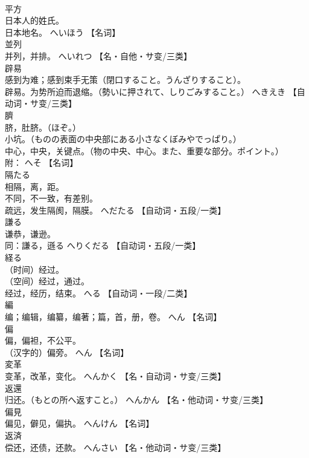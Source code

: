 \documentclass[8pt]{extreport}
\begin{document}
\begin{CJK}{UTF8}{min}
\\	平方	
\\	日本人的姓氏。 
\\	日本地名。	へいほう		【名词】
\\	並列	
\\	并列，并排。	へいれつ		【名・自他・サ变/三类】
\\	辟易	
\\	感到为难；感到束手无策（閉口すること。うんざりすること）。 
\\	辟易。为势所迫而退缩。（勢いに押されて、しりごみすること。）	へきえき		【自动词・サ变/三类】
\\	臍	
\\	脐，肚脐。（ほぞ。） 
\\	小坑。（ものの表面の中央部にある小さなくぼみやでっぱり。） 
\\	中心，中央，关键点。（物の中央、中心。また、重要な部分。ポイント。） 
\\	附：	へそ		【名词】
\\	隔たる	
\\	相隔，离，距。 
\\	不同，不一致，有差别。 
\\	疏远，发生隔阂，隔膜。	へだたる		【自动词・五段/一类】
\\	謙る	
\\	谦恭，谦逊。 
\\	同：謙る，遜る	へりくだる		【自动词・五段/一类】
\\	経る	
\\	（时间）经过。 
\\	（空间）经过，通过。 
\\	经过，经历，结束。	へる		【自动词・一段/二类】
\\	編	
\\	编；编辑，编纂，编著；篇，首，册，卷。	へん		【名词】
\\	偏	
\\	偏，偏袒，不公平。 
\\	（汉字的）偏旁。	へん		【名词】
\\	変革	
\\	变革，改革，变化。	へんかく		【名・自动词・サ变/三类】
\\	返還	
\\	归还。（もとの所へ返すこと。）	へんかん		【名・他动词・サ变/三类】
\\	偏見	
\\	偏见，僻见，偏执。	へんけん		【名词】
\\	返済	
\\	偿还，还债，还款。	へんさい		【名・他动词・サ变/三类】

\end{CJK}
\end{document}
